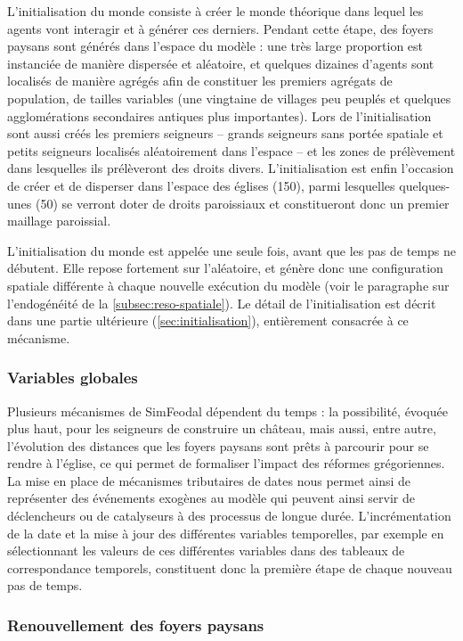 L'initialisation du monde consiste à créer le monde théorique dans lequel les agents vont interagir et à générer ces derniers.
Pendant cette étape, des foyers paysans sont générés dans l'espace du modèle :  une très large proportion est instanciée de manière dispersée et aléatoire, et quelques dizaines d'agents sont localisés de manière agrégés afin de constituer les premiers agrégats de population, de tailles variables (une vingtaine de villages peu peuplés et quelques agglomérations secondaires antiques plus importantes).
Lors de l'initialisation sont aussi créés les premiers seigneurs -- grands seigneurs sans portée spatiale et petits seigneurs localisés aléatoirement dans l'espace -- et les zones de prélèvement dans lesquelles ils prélèveront des droits divers.
L'initialisation est enfin l'occasion de créer et de disperser dans l'espace des églises (150), parmi lesquelles quelques-unes (50) se verront doter de droits paroissiaux et constitueront donc un premier maillage paroissial.

L'initialisation du monde est appelée une seule fois, avant que les pas de temps ne débutent. Elle repose fortement sur l'aléatoire, et génère donc une configuration spatiale différente à chaque nouvelle exécution du modèle (voir le paragraphe sur l'endogénéité de la \cref{subsec:reso-spatiale}).
Le détail de l'initialisation est décrit dans une partie ultérieure (\cref{sec:initialisation}), entièrement consacrée à ce mécanisme.

\subsubsection{Variables globales}

Plusieurs mécanismes de SimFeodal dépendent du temps : la possibilité, évoquée plus haut, pour les seigneurs de construire un château, mais aussi, entre autre, l'évolution des distances que les foyers paysans sont prêts à parcourir pour se rendre à l'église, ce qui permet de formaliser l'impact des réformes grégoriennes.
La mise en place de mécanismes tributaires de dates nous permet ainsi de représenter des événements exogènes au modèle qui peuvent ainsi servir de déclencheurs ou de catalyseurs à des processus de longue durée.
L'incrémentation de la date et la mise à jour des différentes variables temporelles, par exemple en sélectionnant les valeurs de ces différentes variables dans des tableaux de correspondance temporels, constituent donc la première étape de chaque nouveau pas de temps.

\subsubsection{Renouvellement des foyers paysans}

